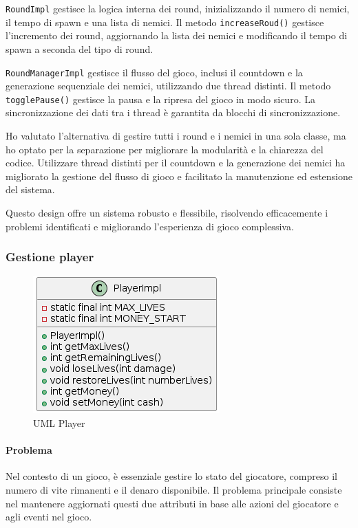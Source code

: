 \documentclass[a4paper,12pt]{report}
\begin{document}
\texttt{RoundImpl} gestisce la logica interna dei round, inizializzando il numero di nemici, il tempo di spawn e una lista di nemici. Il metodo \texttt{increaseRoud()} gestisce l'incremento dei round, aggiornando la lista dei nemici e modificando il tempo di spawn a seconda del tipo di round.

\texttt{RoundManagerImpl} gestisce il flusso del gioco, inclusi il countdown e la generazione sequenziale dei nemici, utilizzando due thread distinti. Il metodo \texttt{togglePause()} gestisce la pausa e la ripresa del gioco in modo sicuro. La sincronizzazione dei dati tra i thread è garantita da blocchi di sincronizzazione.

Ho valutato l'alternativa di gestire tutti i round e i nemici in una sola classe, ma ho optato per la separazione per migliorare la modularità e la chiarezza del codice. Utilizzare thread distinti per il countdown e la generazione dei nemici ha migliorato la gestione del flusso di gioco e facilitato la manutenzione ed estensione del sistema.

Questo design offre un sistema robusto e flessibile, risolvendo efficacemente i problemi identificati e migliorando l'esperienza di gioco complessiva.

\subsubsection{Gestione player}

\begin{figure}[H]
    \centering
    \includegraphics[scale=1.2]{Player}
    \caption{UML Player}
    \label{fig:player}
\end{figure}


\paragraph{Problema} Nel contesto di un gioco, è essenziale gestire lo stato del giocatore, compreso il numero di vite rimanenti e il denaro disponibile. Il problema principale consiste nel mantenere aggiornati questi due attributi in base alle azioni del giocatore e agli eventi nel gioco.
\end{document}
